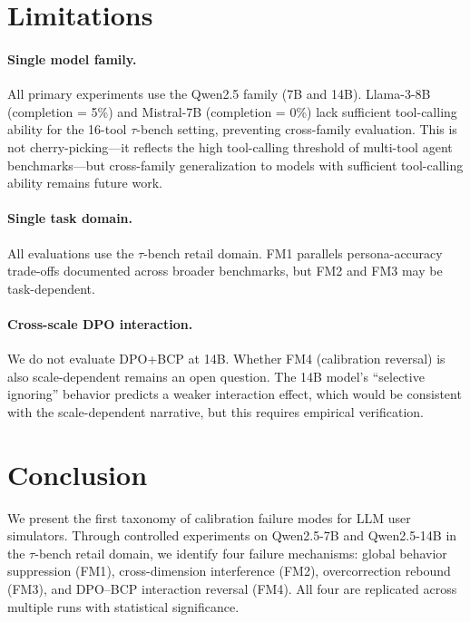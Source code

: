 \documentclass[11pt,a4paper]{article}
\newcommand{\fm}[1]{\textsc{FM#1}}
\newcommand{\bcp}{\textsc{BCP}}
\newcommand{\taubench}{$\tau$-bench}
\begin{document}
\section{Limitations}
\label{sec:limitations}

\paragraph{Single model family.}
All primary experiments use the Qwen2.5 family (7B and 14B).
Llama-3-8B (completion = 5\%) and Mistral-7B (completion = 0\%) lack sufficient tool-calling ability for the 16-tool \taubench{} setting, preventing cross-family evaluation.
This is not cherry-picking---it reflects the high tool-calling threshold of multi-tool agent benchmarks---but cross-family generalization to models with sufficient tool-calling ability remains future work.

\paragraph{Single task domain.}
All evaluations use the \taubench{} retail domain.
\fm{1} parallels persona-accuracy trade-offs documented across broader benchmarks, but \fm{2} and \fm{3} may be task-dependent.

\paragraph{Cross-scale DPO interaction.}
We do not evaluate DPO+\bcp{} at 14B.
Whether \fm{4} (calibration reversal) is also scale-dependent remains an open question.
The 14B model's ``selective ignoring'' behavior predicts a weaker interaction effect, which would be consistent with the scale-dependent narrative, but this requires empirical verification.

\section{Conclusion}
\label{sec:conclusion}

We present the first taxonomy of calibration failure modes for LLM user simulators.
Through controlled experiments on Qwen2.5-7B and Qwen2.5-14B in the \taubench{} retail domain, we identify four failure mechanisms: global behavior suppression (\fm{1}), cross-dimension interference (\fm{2}), overcorrection rebound (\fm{3}), and DPO--\bcp{} interaction reversal (\fm{4}).
All four are replicated across multiple runs with statistical significance.
\end{document}
